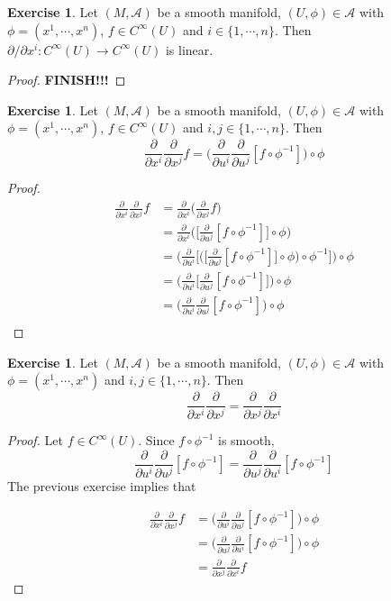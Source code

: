 \documentclass{book}
\theoremstyle{definition}
\newtheorem{ex}[definition]{Exercise}
\newcommand{\MA}{\mathcal{A}}
\DeclareMathOperator*{\0}{\mbf{0}}
\DeclareMathOperator*{\1}{\mbf{1}}
\newcommand{\p}{\partial}
\begin{document}
	\begin{ex}
	Let $(M, \MA)$ be a smooth manifold, $(U, \phi) \in \MA$ with $\phi = (x^1, \cdots, x^n)$, $f \in C^{\infty}(U)$ and $i \in \{1, \cdots, n\}$. Then $\p / \p x^i:  C^{\infty}(U) \rightarrow C^{\infty}(U)$ is linear.
	\end{ex}
	
	\begin{proof}
	\textbf{FINISH!!!}
	\end{proof}
	
	\begin{ex}
	Let $(M, \MA)$ be a smooth manifold, $(U, \phi) \in \MA$ with $\phi = (x^1, \cdots, x^n)$, $f \in C^{\infty}(U)$ and $i,j \in \{1, \cdots, n\}$. Then 
	$$\frac{\p}{\p x^i}\frac{\p}{\p x^j} f =  \bigg(\frac{\p}{\p u^i} \frac{\p}{\p u^j}[f \circ \phi^{-1}] \bigg) \circ \phi $$
	\end{ex}
	
	\begin{proof}
	
	\begin{align*}
	\frac{\p}{\p x^i}\frac{\p}{\p x^j} f 
	&=\frac{\p}{\p x^i} \bigg(\frac{\p}{\p x^j} f \bigg) \\
	&=\frac{\p}{\p x^i} \bigg( \bigg[\frac{\p}{\p u^j} [f \circ \phi^{-1}] \bigg] \circ \phi \bigg) \\
	&=  \bigg( \frac{\p}{\p u^i} \bigg[ \bigg( \bigg[\frac{\p}{\p u^j} [f \circ \phi^{-1}] \bigg] \circ \phi \bigg) \circ \phi^{-1} \bigg] \bigg) \circ \phi \\
	&= \bigg( \frac{\p}{\p u^i} \bigg[\frac{\p}{\p u^j} [f \circ \phi^{-1}] \bigg]  \bigg) \circ \phi \\
	&= \bigg( \frac{\p}{\p u^i} \frac{\p}{\p u^j} [f \circ \phi^{-1}]  \bigg) \circ \phi \\
	\end{align*}
	\end{proof}
	
	\begin{ex}
	Let $(M, \MA)$ be a smooth manifold, $(U, \phi) \in \MA$ with $\phi = (x^1, \cdots, x^n)$ and $i,j \in \{1, \cdots, n\}$. Then 
	\begin{equation*}
	\frac{\p}{\p x^i}\frac{\p}{\p x^j} =\frac{\p}{\p x^j}\frac{\p}{\p x^i}
	\end{equation*}
	\end{ex}
	
	\begin{proof}
	Let $f \in C^{\infty}(U)$. Since $f \circ \phi^{-1}$ is smooth, $$\frac{\p}{\p u^i} \frac{\p}{\p u^j} [f \circ \phi^{-1}] = \frac{\p}{\p u^j} \frac{\p}{\p u^i} [f \circ \phi^{-1}] $$
	The previous exercise implies that 
	
	\begin{align*}
	\frac{\p}{\p x^i}\frac{\p}{\p x^j}f 
	&= \bigg( \frac{\p}{\p u^i} \frac{\p}{\p u^j} [f \circ \phi^{-1}]  \bigg) \circ \phi \\
	&= \bigg( \frac{\p}{\p u^j} \frac{\p}{\p u^i} [f \circ \phi^{-1}]  \bigg) \circ \phi \\
	&=\frac{\p}{\p x^j}\frac{\p}{\p x^i}f 
	\end{align*}
	\end{proof}
	
\end{document}
